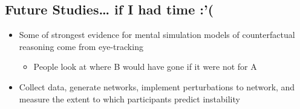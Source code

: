 \documentclass[
  .7em,
  letterpaper,
  DIV=11,
  numbers=noendperiod]{scrartcl}
\providecommand{\tightlist}{%
  \setlength{\itemsep}{0pt}\setlength{\parskip}{0pt}}\usepackage{longtable,booktabs,array}
\begin{document}
\hypertarget{future-studies-if-i-had-time}{%
\subsection{Future Studies\ldots{} if I had time
:'(}\label{future-studies-if-i-had-time}}

\begin{itemize}
\item
  Some of strongest evidence for mental simulation models of
  counterfactual reasoning come from eye-tracking

  \begin{itemize}
  \tightlist
  \item
    People look at where B would have gone if it were not for A
  \end{itemize}
\item
  Collect data, generate networks, implement perturbations to network,
  and measure the extent to which participants predict instability
\end{itemize}
\end{document}
